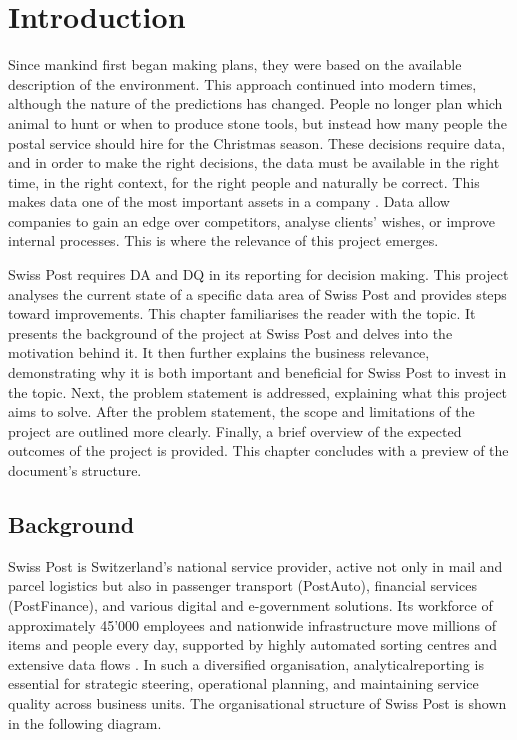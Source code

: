 \chapter{Introduction}

Since mankind first began making plans, they were based on the available description of the environment. This approach continued into modern times, although the nature of the predictions has changed. People no longer plan which animal to hunt or when to produce stone tools, but instead how many people the postal service should hire for the Christmas season. These decisions require data, and in order to make the right decisions, the data must be available in the right time, in the right context, for the right people and naturally be correct. This makes data one of the most important assets in a company \cite{economist2017_dataoil}. Data allow companies to gain an edge over competitors, analyse clients’ wishes, or improve internal processes. This is where the relevance of this project emerges. 

Swiss Post requires \gls{DA} and \gls{DQ} in its reporting for decision making. This project analyses the current state of a specific data area of Swiss Post and provides steps toward improvements.
This chapter familiarises the reader with the topic. It presents the background of the project at Swiss Post and delves into the motivation behind it. It then further explains the business relevance, demonstrating why it is both important and beneficial for Swiss Post to invest in the topic. Next, the problem statement is addressed, explaining what this project aims to solve. After the problem statement, the scope and limitations of the project are outlined more clearly. Finally, a brief overview of the expected outcomes of the project is provided. This chapter concludes with a preview of the document’s structure.


\section{Background}
\label{IntroBackground}
Swiss Post is Switzerland’s national service provider, active not only in mail and parcel logistics but also in passenger transport (PostAuto), financial services (PostFinance), and various digital and e-government solutions. Its workforce of approximately 45’000 employees and nationwide infrastructure move millions of items and people every day, supported by highly automated sorting centres and extensive data flows \cite{postGeschäftsbericht2024}. In such a diversified organisation, \gls{analyticalreporting} is essential for strategic steering, operational planning, and maintaining service quality across business units. The organisational structure of Swiss Post is shown in the following diagram.

